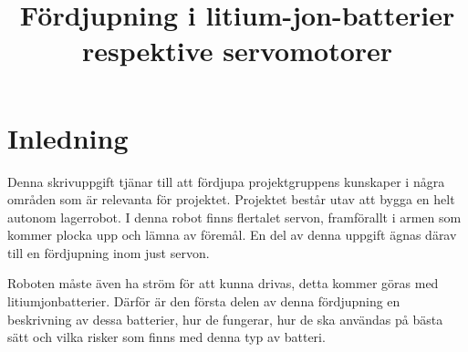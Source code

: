\documentclass[a4paper,12pt]{article}
\title{Fördjupning i litium-jon-batterier respektive servomotorer}
\renewcommand{\thepage}{\roman{page}}
\begin{document}
\LIPStitelsida

\begin{LIPSprojektidentitet}
\end{LIPSprojektidentitet}


\renewcommand*\contentsname{Innehåll}
\begin{spacing}{0.5}
\tableofcontents{}
\end{spacing}
\newpage

\begin{LIPSdokumenthistorik}
\end{LIPSdokumenthistorik}
\newpage

\renewcommand{\thepage}{\arabic{page}}
\setcounter{page}{1}

\section{Inledning}
Denna skrivuppgift tjänar till att fördjupa projektgruppens kunskaper i några områden som är relevanta för projektet. Projektet består utav att bygga en helt autonom lagerrobot. I denna robot finns flertalet servon, framförallt i armen som kommer plocka upp och lämna av föremål. En del av denna uppgift ägnas därav till en fördjupning inom just servon.

Roboten måste även ha ström för att kunna drivas, detta kommer göras med litiumjonbatterier. Därför är den första delen av denna fördjupning en beskrivning av dessa batterier, hur de fungerar, hur de ska användas på bästa sätt och vilka risker som finns med denna typ av batteri.
\end{document}

